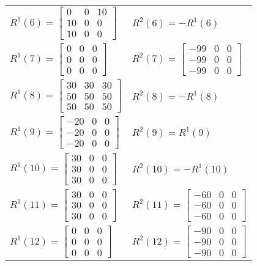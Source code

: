 \documentclass{acm_proc_article-sp}
\begin{document}
\begin{table}[htbp]
\begin{tabular}{ll}
$R^{1}(6)=\begin{bmatrix}0&0&10 \\10&0&0 \\10&0&0\end{bmatrix}$          &$R^{2}(6)=-R^{1}(6)$\\
$R^{1}(7)=\begin{bmatrix}0&0&0 \\0&0&0 \\0&0&0\end{bmatrix}$          &$R^{2}(7)=\begin{bmatrix}-99&0&0 \\-99&0&0 \\-99&0&0\end{bmatrix}$\\
$R^{1}(8)=\begin{bmatrix}30&30&30 \\50&50&50 \\50&50&50\end{bmatrix}$          &$R^{2}(8)=-R^{1}(8)$\\
$R^{1}(9)=\begin{bmatrix}-20&0&0 \\-20&0&0 \\-20&0&0\end{bmatrix}$          &$R^{2}(9)=R^{1}(9)$\\
$R^{1}(10)=\begin{bmatrix}30&0&0 \\30&0&0 \\30&0&0\end{bmatrix}$          &$R^{2}(10)=-R^{1}(10)$\\
$R^{1}(11)=\begin{bmatrix}30&0&0 \\30&0&0 \\30&0&0\end{bmatrix}$          &$R^{2}(11)=\begin{bmatrix}-60&0&0 \\-60&0&0 \\-60&0&0\end{bmatrix}$\\
$R^{1}(12)=\begin{bmatrix}0&0&0 \\0&0&0 \\0&0&0\end{bmatrix}$          &$R^{2}(12)=\begin{bmatrix}-90&0&0 \\-90&0&0 \\-90&0&0\end{bmatrix}$\\

\end{tabular}
\end{table}
\end{document}
